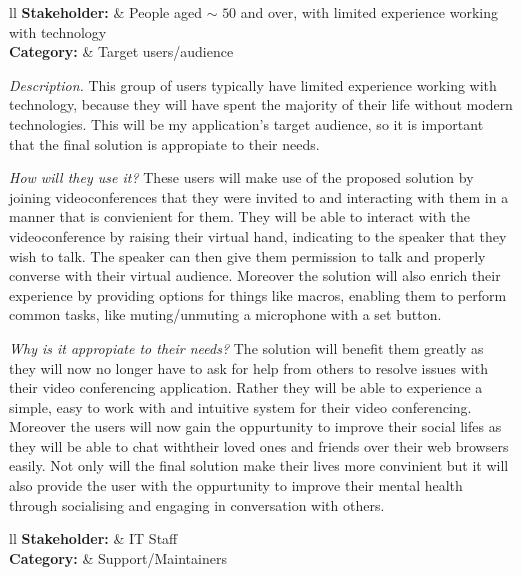 \noindent
\begin{tblr}{ll}
  \textbf{Stakeholder: } & {People aged $\sim$ 
  \hspace{-0.2cm} $50$ and over, with limited experience
  working with technology}\\
  \textbf{Category: } & Target users/audience\\
\end{tblr}
\vspace{0.2cm}

\textit{Description.}  
This group of users typically have limited experience working 
with technology, because they will have spent the majority of
their life without modern technologies. This will be my 
application's target audience, so it is important that the 
final solution is appropiate to their needs. \vspace{0.2cm}

\textit{How will they use it?}
These users will make use of the proposed solution by joining
videoconferences that they were invited to and interacting with
them in a manner that is convienient for them. They will be 
able to interact with the videoconference by raising their 
virtual hand, indicating to the speaker that they wish to talk.
The speaker can then give them permission to talk and properly
converse with their virtual audience. Moreover the solution
will also enrich their experience by providing options for
things like macros, enabling them to perform common tasks,
like muting/unmuting a microphone with a set button.
\vspace{0.2cm}

\textit{Why is it appropiate to their needs?}
The solution will benefit them greatly as they will now no 
longer have to ask for help from others to resolve issues with
their video conferencing application. Rather they will be able
to experience a simple, easy to work with and intuitive system
for their video conferencing. Moreover the users will now gain
the oppurtunity to improve their social lifes as they will be
able to chat withtheir loved ones and friends over their web 
browsers easily. Not only will the final solution make their 
lives more convinient but it will also provide the user with
the oppurtunity to improve their mental health through
socialising and engaging in conversation with others.
\cite{social}
\vspace{0.2cm}

\noindent
\begin{tblr}{ll}
  \textbf{Stakeholder: } & IT Staff\\
  \textbf{Category: } & Support/Maintainers\\
\end{tblr}
\vspace{0.2cm}

